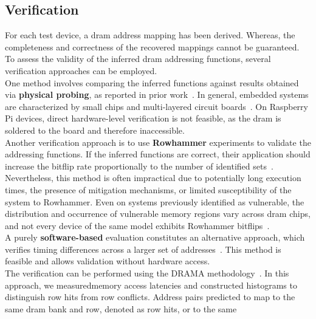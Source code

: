     \subsection{Verification} \label{subsec:verification}
        For each test device, a \gls{dram} address mapping has been derived. Whereas, the completeness and 
        correctness of the recovered mappings cannot be guaranteed. To assess the validity of the inferred 
        \gls{dram} addressing functions, several verification approaches can be employed.
        \\
        One method involves comparing the inferred functions against results obtained via \textbf{physical probing}, 
        as reported in prior work~\cite{paperDRAMA}. In general, embedded systems are characterized by small chips and 
        multi-layered circuit boards~\cite{thesisDRAMA}. On Raspberry Pi devices, direct hardware-level verification is 
        not feasible, as the \gls{dram} is soldered to the board and therefore inaccessible.
        \\
        Another verification approach is to use \textbf{Rowhammer} experiments to validate the addressing functions. 
        If the inferred functions are correct, their application should increase the bitflip rate 
        proportionally to the number of identified sets~\cite{paperDRAMA}. Nevertheless, this method is often impractical due 
        to potentially long execution times, the presence of mitigation mechanisms, or limited susceptibility 
        of the system to Rowhammer. Even on systems previously identified as vulnerable, the distribution 
        and occurrence of vulnerable memory regions vary across \gls{dram} chips, and not every device of the 
        same model exhibits Rowhammer bitflips~\cite{paperDrammer,thesisCacheAttacksandRH}.
        \\
        A purely \textbf{software-based} evaluation constitutes an alternative approach, which verifies timing 
        differences across a larger set of addresses~\cite{paperDRAMA}. This method is feasible and allows validation 
        without hardware access.
        \\
        The verification can be performed using the DRAMA methodology~\cite{paperDRAMA,toolDrama}. In this approach, we measuredmemory 
        access latencies and constructed histograms to distinguish row hits from row 
        conflicts. Address pairs predicted to map to the same \gls{dram} bank and row, denoted as row hits, or to the same 
